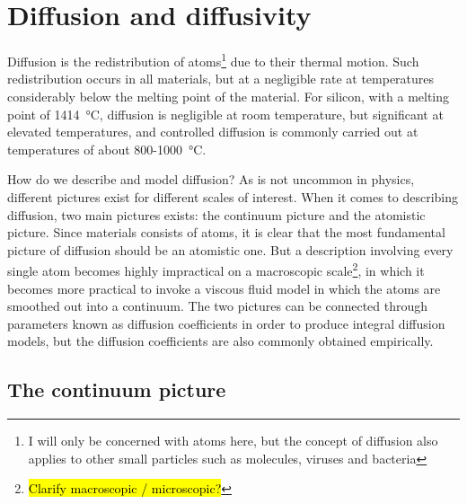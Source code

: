 \documentclass[11pt,bibliography=totoc,index=totoc]{scrbook}   %
\newcommand{\comment}[1]{\hl{#1}}
\begin{document}
\section{Diffusion and diffusivity}\label{sec:Diffusion}
%

Diffusion is the redistribution of atoms\footnote{I will only be concerned with atoms here, but the concept of diffusion also applies to other small particles such as molecules, viruses and bacteria} due to their thermal motion. 
Such redistribution occurs in all materials, but at a negligible rate at temperatures considerably below the melting point of the material.
For silicon, with a melting point of \SI{1414}{\celsius}, diffusion is negligible at room temperature, 
but significant at elevated temperatures, and controlled diffusion is commonly carried out at temperatures 
of about 800-\SI{1000}{\celsius}. 

How do we describe and model diffusion?
As is not uncommon in physics, different pictures exist for different scales of interest. 
When it comes to describing diffusion, two main pictures exists: the continuum picture and the atomistic picture. 
Since materials consists of atoms, it is clear that the most fundamental picture of diffusion should be an atomistic one.
But a description involving every single atom becomes highly impractical on a macroscopic scale\footnote{\comment{Clarify macroscopic / microscopic?}
}, in which it becomes more practical to invoke a viscous fluid model in which the atoms are smoothed out into a continuum.
The two pictures can be connected through parameters known as diffusion coefficients in order to produce integral diffusion models,
but the diffusion coefficients are also commonly obtained empirically.

%
\subsection{The continuum picture}\label{sec:ContinuumPicture}
%
\end{document}
